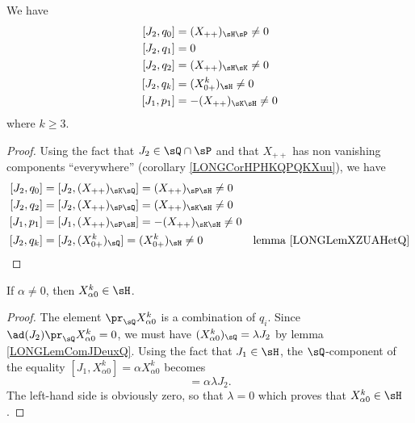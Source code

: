\begin{lemma}		\label{LONGLemComJDeuxQ}
	We have
	\begin{equation}
		\begin{aligned}[]
			[J_2,q_0]&=(X_{++})_{\sH\sP}\neq 0\\
			[J_2,q_1]&=0\\
			[J_2,q_2]&=(X_{++})_{\sH\sK}\neq 0\\
			[J_2,q_k]&=(X^k_{0+})_{\sH}\neq 0\\
			[J_1,p_1]&=-(X_{++})_{\sK\sH}\neq 0
		\end{aligned}
	\end{equation}
	where $k\geq 3$. 
\end{lemma}

\begin{proof}
	Using the fact that $J_2\in\sQ\cap\sP$ and that $X_{++}$ has non vanishing components ``everywhere'' (corollary \ref{LONGCorHPHKQPQKXuu}), we have
	\begin{equation}
		\begin{aligned}[]
			[J_2,q_0]&=[J_2,(X_{++})_{\sK\sQ}]=(X_{++})_{\sP\sH}\neq 0\\
			[J_2,q_2]&=[J_2,(X_{++})_{\sP\sQ}]=(X_{++})_{\sK\sH}\neq 0\\
			[J_1,p_1]&=[J_1,(X_{++})_{\sP\sH}]=-(X_{++})_{\sK\sH}\neq 0\\
			[J_2,q_k]&=[J_2,(X_{0+}^k)_{\sQ}]=(X^k_{0+})_{\sH}\neq 0		&\text{lemma \ref{LONGLemXZUAHetQ}}\\
		\end{aligned}
	\end{equation}
\end{proof}

\begin{lemma}		\label{LONGLemNonHXaz}
	If $\alpha\neq 0$, then $X_{\alpha 0}^k\in\sH$.
\end{lemma}

\begin{proof}
	The element $\pr_{\sQ}X^k_{\alpha 0}$ is a combination of $q_i$. Since $\ad(J_2)\pr_{\sQ}X^k_{\alpha 0}=0$, we must have $(X^k_{\alpha 0})_{\sQ}=\lambda J_2$ by lemma \ref{LONGLemComJDeuxQ}. Using the fact that $J_1\in\sH$, the $\sQ$-component of the equality $[J_1,X^k_{\alpha 0}]=\alpha X^k_{\alpha 0}$ becomes
	\begin{equation}
		[J_1,\lambda J_2]=\alpha\lambda J_2.
	\end{equation}
	The left-hand side is obviously zero, so that $\lambda=0$ which proves that $X^k_{\alpha 0}\in\sH$.
\end{proof}

